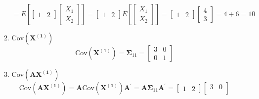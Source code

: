 \begin{enumerate}[font=\bfseries]
\begin{enumerate}
\[                =
                E\left[
                    \begin{bmatrix}
                        1 & 2
                    \end{bmatrix}
                    \begin{bmatrix}
                        X_1 \\
                        X_2
                    \end{bmatrix}
                \right]
                =
                \begin{bmatrix}
                    1 & 2
                \end{bmatrix}
                E\left[
                    \begin{bmatrix}
                        X_1 \\
                        X_2
                    \end{bmatrix}
                \right]
                =
                \begin{bmatrix}
                    1 & 2
                \end{bmatrix}
                \begin{bmatrix}
                    4 \\
                    3
                \end{bmatrix}
                =
                4 + 6 = 10
            \]
            \item $\text{Cov}\left(\mathbf{X^{(1)}}\right)$
            \[
                \text{Cov}\left(\mathbf{X^{(1)}}\right)
                =
                \mathbf{\Sigma}_{11}
                =
                \begin{bmatrix}
                    3 & 0 \\
                    0 & 1
                \end{bmatrix}
            \]
            \item $\text{Cov}\left(\mathbf{A}\mathbf{X^{(1)}}\right)$
            \[
                \text{Cov}\left(\mathbf{A}\mathbf{X^{(1)}}\right)
                =
                \mathbf{A}\text{Cov}\left(\mathbf{X^{(1)}}\right)\mathbf{A}^\prime
                =
                \mathbf{A}\mathbf{\Sigma}_{11}\mathbf{A}^\prime
                =
                \begin{bmatrix}
                    1 & 2
                \end{bmatrix}
                \begin{bmatrix}
                    3 & 0 \\

\end{bmatrix}\]
\end{enumerate}
\end{enumerate}

